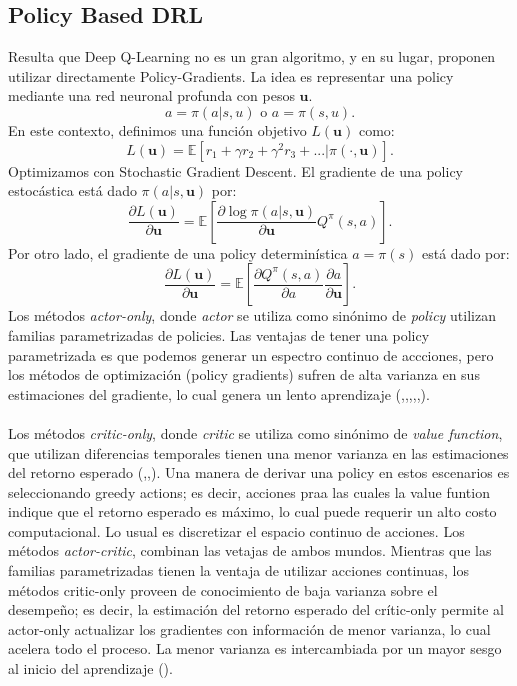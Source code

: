 \documentclass[11pt]{article}
\theoremstyle{plain}
\begin{document}
\subsection{Policy Based DRL}
Resulta que Deep Q-Learning no es un gran algoritmo, y en su lugar, \cite{DBLP:journals/corr/MnihBMGLHSK16} proponen utilizar directamente Policy-Gradients.
La idea es representar una policy mediante una red neuronal profunda con pesos $\textbf{u}$.
\[ a = \pi (a|s,u) \textrm{ o } a = \pi (s,u). \]
En este contexto, definimos una función objetivo $L(\textbf{u})$ como:
		\[ L(\textbf{u}) = \mathbb{E}[r_1 + \gamma r_2 + \gamma^2 r_3 + ... |  \pi(\cdot,\textbf{u})]. \]
Optimizamos con Stochastic Gradient Descent. El gradiente de una policy estocástica está dado $\pi (a|s,\textbf{u})$ por:
		\[ \frac{\partial L(\textbf{u})}{\partial \textbf{u}}  = \mathbb{E}\left[  \frac{\partial \log \pi(a|s,\textbf{u})}{\partial \textbf{u}}Q^\pi(s,a)\right].\]
Por otro lado, el gradiente de una policy determinística $a=\pi(s)$ está dado por:
\[ \frac{\partial L(\textbf{u})}{\partial \textbf{u}}  = \mathbb{E}\left[ \frac{\partial Q^\pi (s,a)}{\partial a} \frac{\partial a}{\partial \textbf{u}} \right]. \]
 Los métodos \textit{actor-only}, donde \textit{actor} se utiliza como sinónimo de \textit{policy} utilizan familias parametrizadas de policies. Las ventajas de tener una policy parametrizada es que podemos generar un espectro continuo de accciones, pero los métodos de optimización (policy gradients) sufren de alta varianza en sus estimaciones del gradiente, lo cual genera un lento aprendizaje (\cite{grondman2012survey},\cite{konda2003onactor},\cite{richter2007natural},\cite{boyan2002technical},\cite{baxter2001infinite},\cite{berenji2003convergent}).\\
 \\
Los métodos \textit{critic-only}, donde \textit{critic} se utiliza como sinónimo de \textit{value function}, que utilizan diferencias temporales tienen una menor varianza en las estimaciones del retorno esperado (\cite{boyan2002technical},\cite{berenji2003convergent},\cite{sutton1988learning}). Una manera de derivar una policy en estos escenarios es seleccionando greedy actions; es decir, acciones praa las cuales la value funtion indique que el retorno esperado es máximo, lo cual puede requerir un alto costo computacional. Lo usual es discretizar el espacio continuo de acciones.
Los métodos \textit{actor-critic}, combinan las vetajas de ambos mundos. Mientras que las familias parametrizadas tienen la ventaja de utilizar acciones continuas, los métodos critic-only proveen de conocimiento de baja varianza sobre el desempeño; es decir, la estimación del retorno esperado del crític-only permite al actor-only actualizar los gradientes con información de menor varianza, lo cual acelera todo el proceso. La menor varianza es intercambiada por un mayor sesgo al inicio del aprendizaje (\cite{berenji2003convergent}). \\
\end{document}
